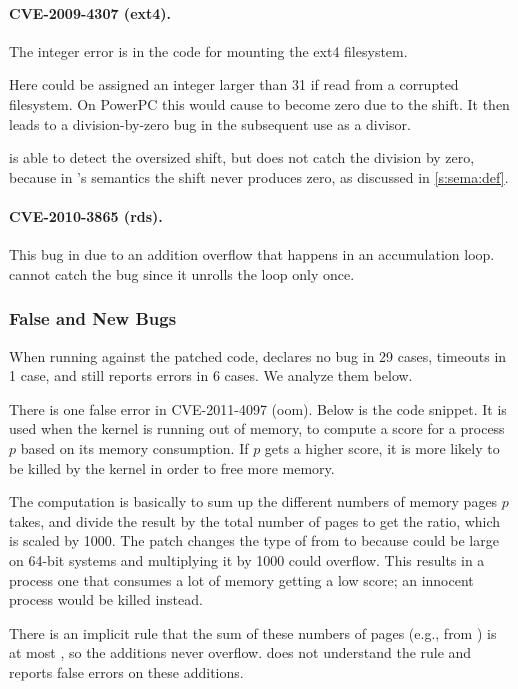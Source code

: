 \paragraph{CVE-2009-4307 (ext4).}
The integer error is in the code for mounting the ext4 filesystem.

Here  could be assigned an integer
larger than 31 if read from a corrupted filesystem.  On PowerPC
this would cause  to become zero due to the
shift.  It then leads to a division-by-zero bug in the subsequent
use as a divisor.

\sys is able to detect the oversized shift, but does not catch the
division by zero, because in \sys's semantics the shift never
produces zero, as discussed in \autoref{s:sema:def}.

\paragraph{CVE-2010-3865 (rds).}
This bug in due to an addition overflow that happens in an accumulation
loop.  \sys cannot catch the bug since it unrolls the loop only
once.

\subsubsection{False and New Bugs}

When running against the patched code, \sys declares no bug in 29
cases, timeouts in 1 case, and still reports errors in 6 cases.
We analyze them below.

There is one false error in CVE-2011-4097 (oom).  Below is the code
snippet.  It is used when the kernel is running out of memory, to
compute a score for a process $p$ based on its memory consumption.
If $p$ gets a higher score, it is more likely to be killed by the
kernel in order to free more memory.

The computation is basically to sum up the different numbers of
memory pages $p$ takes, and divide the result by the total number
of pages to get the ratio, which is scaled by 1000.  The patch
changes the type of  from  to  because
 could be large on 64-bit systems and multiplying it by
1000 could overflow.  This results in a process one that consumes
a lot of memory getting a low score; an innocent process would be
killed instead.

There is an implicit rule that the sum of these numbers of pages
(e.g., from ) is at most , so the
additions never overflow.  \sys does not understand the rule and
reports false errors on these additions.

